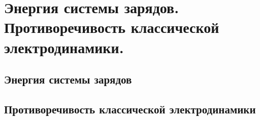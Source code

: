 \chapter{Энергия системы зарядов. Противоречивость классической 
электродинамики.}

\section{Энергия системы зарядов}
\section{Противоречивость классической электродинамики}
